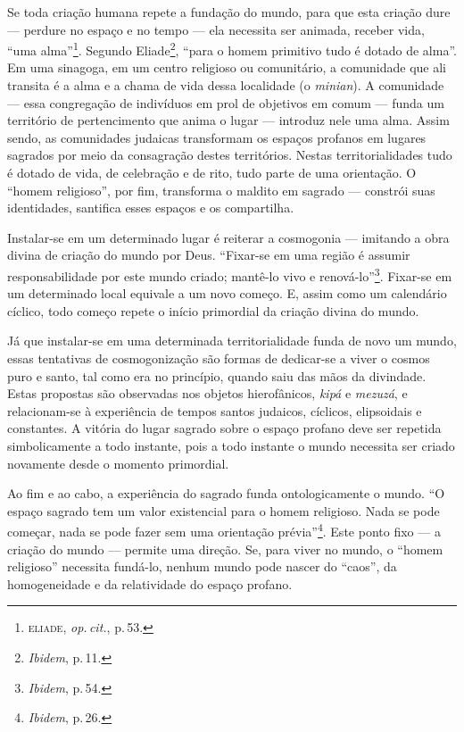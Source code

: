 Se toda criação humana repete a fundação do mundo, para que esta criação
dure --- perdure no espaço e no tempo --- ela necessita ser animada,
receber vida, ``uma alma''\footnote{\textsc{eliade}, \emph{op.\,cit.}, p.\,53.}. Segundo
Eliade\footnote{\emph{Ibidem}, p.\,11.}, ``para o homem primitivo tudo é
dotado de alma''. Em uma sinagoga, em um centro religioso ou
comunitário, a comunidade que ali transita é a alma e a chama de vida
dessa localidade (o \emph{minian}). A comunidade --- essa congregação de
indivíduos em prol de objetivos em comum --- funda um território de
pertencimento que anima o lugar --- introduz nele uma alma. Assim sendo,
as comunidades judaicas transformam os espaços profanos em lugares
sagrados por meio da consagração destes territórios. Nestas
territorialidades tudo é dotado de vida, de celebração e de rito, tudo
parte de uma orientação. O ``homem religioso'', por fim, transforma o
maldito em sagrado --- constrói suas identidades, santifica esses
espaços e os compartilha.

Instalar-se em um determinado lugar é reiterar a cosmogonia --- imitando
a obra divina de criação do mundo por Deus. ``Fixar-se em uma
região é assumir responsabilidade por este mundo criado; mantê-lo vivo e
renová-lo''\footnote{\emph{Ibidem}, p.\,54.}. Fixar-se em um determinado local
equivale a um novo começo. E, assim como um calendário cíclico, todo
começo repete o início primordial da criação divina do mundo.

Já que instalar-se em uma determinada territorialidade funda de novo um
mundo, essas tentativas de cosmogonização são formas de dedicar-se a
viver o cosmos puro e santo, tal como era no princípio, quando saiu das
mãos da divindade. Estas propostas são observadas nos objetos
hierofânicos, \emph{kipá} e \emph{mezuzá}, e relacionam-se à
experiência de tempos santos judaicos, cíclicos, elipsoidais e
constantes. A vitória do lugar sagrado sobre o espaço profano deve ser
repetida simbolicamente a todo instante, pois a todo instante o mundo
necessita ser criado novamente desde o momento primordial.

Ao fim e ao cabo, a experiência do sagrado funda ontologicamente o
mundo. ``O espaço sagrado tem um valor existencial para o homem
religioso. Nada se pode começar, nada se pode fazer sem uma orientação
prévia''\footnote{\emph{Ibidem}, p.\,26.}. Este ponto fixo --- a criação do
mundo --- permite uma direção. Se, para viver no mundo, o ``homem
religioso'' necessita fundá-lo, nenhum mundo pode nascer do ``caos'', da
homogeneidade e da relatividade do espaço profano.

